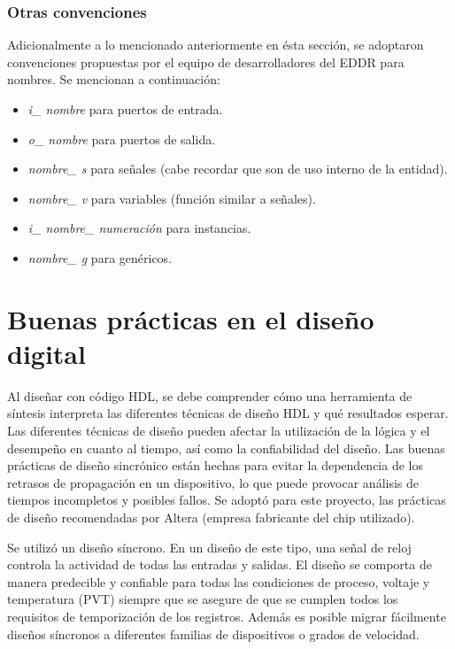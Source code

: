 \subsubsection{Otras convenciones}
Adicionalmente a lo mencionado anteriormente en ésta sección, se adoptaron convenciones propuestas por el equipo de desarrolladores del EDDR para nombres. Se mencionan a continuación:
\begin{itemize}
\item \textit{i\_ nombre} para puertos de entrada.

\item \textit{o\_ nombre} para puertos de salida.

\item \textit{nombre\_ s} para señales (cabe recordar que son de uso interno de la entidad).

\item \textit{nombre\_ v} para variables (función similar a señales).

\item \textit{i\_ nombre\_ numeración} para instancias.

\item \textit{nombre\_ g} para genéricos.

\end{itemize}


\section{Buenas prácticas en el diseño digital}

Al diseñar con código HDL, se debe comprender cómo una herramienta de síntesis interpreta las diferentes técnicas de diseño HDL y qué resultados esperar. Las diferentes técnicas de diseño pueden afectar la utilización de la lógica y el desempeño en cuanto al tiempo, así como la confiabilidad del diseño. Las buenas prácticas de diseño sincrónico están hechas para evitar la dependencia de los retrasos de propagación en un dispositivo, lo que puede provocar análisis de tiempos incompletos y posibles fallos. Se adoptó para este proyecto, las prácticas de diseño recomendadas por Altera (empresa fabricante del chip utilizado).


Se utilizó un diseño síncrono. En un diseño de este tipo, una señal de reloj controla la actividad de todas las entradas y salidas. El diseño se comporta de manera predecible y confiable para todas las condiciones de proceso, voltaje y temperatura (PVT) siempre que se asegure de que se cumplen todos los requisitos de temporización de los registros. Además es posible migrar fácilmente diseños síncronos a diferentes familias de dispositivos o grados de velocidad.


